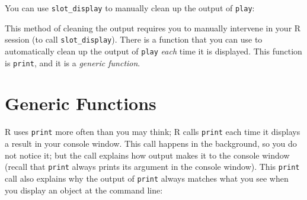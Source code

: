 \documentclass[
  letterpaper,
  DIV=11,
  numbers=noendperiod]{scrbook}
\newenvironment{Shaded}{\begin{snugshade}}{\end{snugshade}}
\newcommand{\DocumentationTok}[1]{\textcolor[rgb]{0.37,0.37,0.37}{\textit{#1}}}
\newcommand{\FunctionTok}[1]{\textcolor[rgb]{0.28,0.35,0.67}{#1}}
\newcommand{\NormalTok}[1]{\textcolor[rgb]{0.00,0.23,0.31}{#1}}
\begin{document}
You can use \texttt{slot\_display} to manually clean up the output of
\texttt{play}:

\begin{Shaded}
\end{Shaded}

This method of cleaning the output requires you to manually intervene in
your R session (to call \texttt{slot\_display}). There is a function
that you can use to automatically clean up the output of \texttt{play}
\emph{each} time it is displayed. This function is \texttt{print}, and
it is a \emph{generic function}.

\section{Generic Functions}\label{generic-functions}

R uses \texttt{print} more often than you may think; R calls
\texttt{print} each time it displays a result in your console window.
This call happens in the background, so you do not notice it; but the
call explains how output makes it to the console window (recall that
\texttt{print} always prints its argument in the console window). This
\texttt{print} call also explains why the output of \texttt{print}
always matches what you see when you display an object at the command
line:
\end{document}
